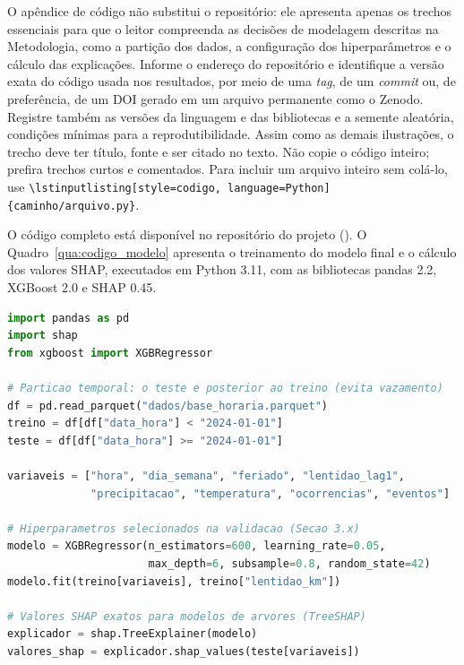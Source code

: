 \label{ap:codigo}

\begin{orientacao}
  O apêndice de código não substitui o repositório: ele apresenta apenas os trechos essenciais para que o leitor compreenda as decisões de modelagem descritas na Metodologia, como a partição dos dados, a configuração dos hiperparâmetros e o cálculo das explicações. Informe o endereço do repositório e identifique a versão exata do código usada nos resultados, por meio de uma \textit{tag}, de um \textit{commit} ou, de preferência, de um DOI gerado em um arquivo permanente como o Zenodo. Registre também as versões da linguagem e das bibliotecas e a semente aleatória, condições mínimas para a reprodutibilidade. Assim como as demais ilustrações, o trecho deve ter título, fonte e ser citado no texto. Não copie o código inteiro; prefira trechos curtos e comentados. Para incluir um arquivo inteiro sem colá-lo, use \texttt{\textbackslash lstinputlisting[style=codigo, language=Python]\{caminho/arquivo.py\}}.
\end{orientacao}

O código completo está disponível no repositório do projeto (). O Quadro~\ref{qua:codigo_modelo} apresenta o treinamento do modelo final e o cálculo dos valores SHAP, executados em Python 3.11, com as bibliotecas pandas 2.2, XGBoost 2.0 e SHAP 0.45.

\begin{quadros}[H]
  \caption{Treinamento do modelo final e cálculo dos valores SHAP}
  \label{qua:codigo_modelo}
\begin{lstlisting}[style=codigo, language=Python]
import pandas as pd
import shap
from xgboost import XGBRegressor

# Particao temporal: o teste e posterior ao treino (evita vazamento)
df = pd.read_parquet("dados/base_horaria.parquet")
treino = df[df["data_hora"] < "2024-01-01"]
teste = df[df["data_hora"] >= "2024-01-01"]

variaveis = ["hora", "dia_semana", "feriado", "lentidao_lag1",
             "precipitacao", "temperatura", "ocorrencias", "eventos"]

# Hiperparametros selecionados na validacao (Secao 3.x)
modelo = XGBRegressor(n_estimators=600, learning_rate=0.05,
                      max_depth=6, subsample=0.8, random_state=42)
modelo.fit(treino[variaveis], treino["lentidao_km"])

# Valores SHAP exatos para modelos de arvores (TreeSHAP)
explicador = shap.TreeExplainer(modelo)
valores_shap = explicador.shap_values(teste[variaveis])
\end{lstlisting}
\end{quadros}